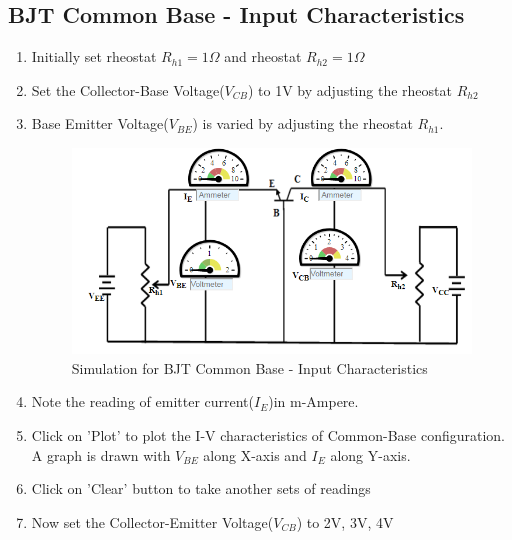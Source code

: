 		\subsection{BJT Common Base - Input Characteristics}
			\begin{enumerate}
				\tightlist
				\item Initially set rheostat $R_{h1} = 1\Omega$ and rheostat $R_{h2} = 1\Omega$
				\item Set the Collector-Base Voltage($V_{CB}$) to 1V by adjusting the rheostat $R_{h2}$
				\item Base Emitter Voltage($V_{BE}$) is varied by adjusting the rheostat $R_{h1}$.
				\begin{figure}[h]
					\centering
					\includegraphics[width=0.7\linewidth]{img/exp10/6}
					\caption{Simulation for BJT Common Base - Input Characteristics}
					\label{fig:bjt2_procedure1}
				\end{figure}
				\item Note the reading of emitter current($I_E$)in m-Ampere.
				\item Click on 'Plot' to plot the I-V characteristics of Common-Base configuration. A graph is drawn with $V_{BE}$ along X-axis and $I_E$ along Y-axis.
				\item Click on 'Clear' button to take another sets of readings
				\item Now set the Collector-Emitter Voltage($V_{CB}$) to 2V, 3V, 4V
			\end{enumerate}
		
